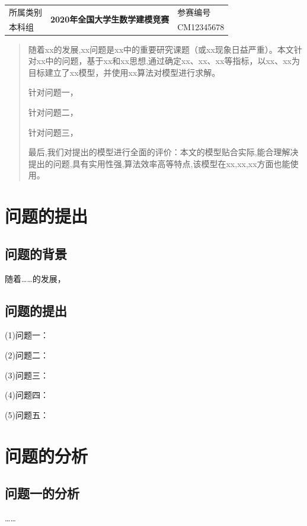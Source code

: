 \documentclass{JXUSTmodeling}
\begin{document}
	\begin{table}[]
		\centering
		\begin{tabular}{|l|c|l|}
			\hline
			\multicolumn{1}{|c|}{所属类别} & \multirow{2}{*}{\large\textbf{2020年全国大学生数学建模竞赛}} & 参赛编号     \\ \cline{1-1} \cline{3-3} 
			本科组            &                                                 & CM12345678 \\ \hline
		\end{tabular}
	\end{table}

\begin{abstract}
	随着xx的发展,xx问题是xx中的重要研究课题（或xx现象日益严重）。本文针对xx中的问题，基于xx和xx思想,通过确定xx、xx、xx等指标，以xx、xx为目标建立了xx模型，并使用xx算法对模型进行求解。

	针对问题一，

	针对问题二，

	针对问题三，

	最后,我们对提出的模型进行全面的评价：本文的模型贴合实际,能合理解决提出的问题,具有实用性强,算法效率高等特点,该模型在xx,xx,xx方面也能使用。
	


\end{abstract}


\section{问题的提出}\label{sec:1}
\subsection{问题的背景}\label{sub:1.1}
随着……的发展，

\subsection{问题的提出}\label{sub:1.3}

(1)问题一：

(2)问题二：

(3)问题三：

(4)问题四：

(5)问题五：
\section{问题的分析}\label{sec:2}

\subsection{问题一的分析}\label{sub:2.2}
……
\end{document}
